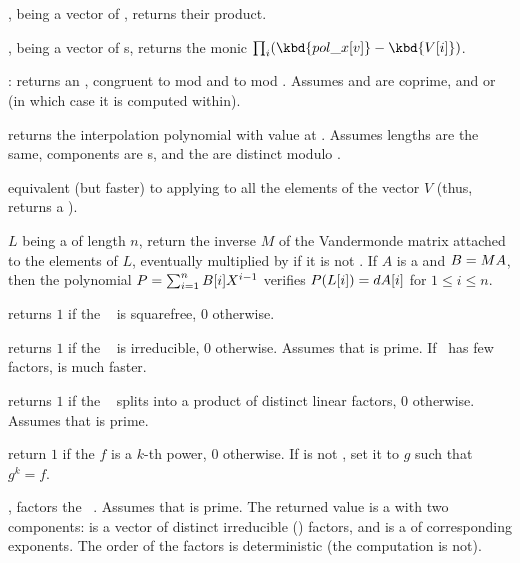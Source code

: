 ,  being a vector of ,
returns their product.

,  being a vector
of s, returns the monic 
$\prod_i (\kbd{pol\_x[v]} - \kbd{V[i]})$.

:
returns an , congruent to  mod  and to  mod
. Assumes  and  are coprime, and 
or  (in which case it is computed within).

 returns the 
interpolation polynomial with value  at . Assumes lengths
are the same, components are s, and the  are distinct
modulo .

 equivalent (but
faster) to applying  to all the elements of the
vector $V$ (thus, returns a ).

 $L$ being a 
of length $n$, return the inverse $M$ of the Vandermonde matrix attached to
the elements of $L$, eventually multiplied by  if it is not
. If $A$ is a  and $B=M\*A$, then the polynomial
$P=\sum_{i=1}^n B[i]\*X^{i-1}$ verifies $P(L[i])=d\*A[i]$ for
$1 \leq i \leq n$.

 returns $1$ if the
~ is squarefree, $0$ otherwise.

 returns $1$ if the ~
is irreducible, $0$ otherwise. Assumes that  is prime. If~ has
few factors,  is much faster.

 returns $1$ if the
~ splits into a product of distinct linear factors, $0$
otherwise. Assumes that  is prime.

return $1$ if the  $f$ is a $k$-th power, $0$ otherwise.
If  is not , set it to $g$ such that $g^k = f$.

, factors the ~. Assumes
that  is prime. The returned value  is a  with two
components:  is a vector of distinct irreducible ()
factors, and  is a  of corresponding exponents. The
order of the factors is deterministic (the computation is not).

